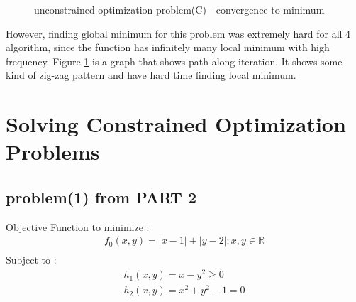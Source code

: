 \documentclass[twoside,11pt]{article}
\begin{document}
\begin{figure}[ht!]%
\centering
{} 
\caption{unconstrained optimization problem(C) - convergence to minimum }
\label{unconstrained problem 3}
\end{figure}

However, finding global minimum for this problem was extremely hard for all 4 algorithm, since the function has infinitely many local minimum with high frequency. Figure \ref{unconstrained problem 3} is a graph that shows path along iteration. It shows some kind of zig-zag pattern and have hard time finding local minimum.
\newpage

\section{Solving Constrained Optimization Problems}
\subsection*{problem(1) from PART 2}
Objective Function to minimize :
\begin{equation}
    \begin{array}{l}
    f_0(x,y)=|x-1|+|y-2|  ; x,y \in \mathbb{R} \\
    \end{array}
\end{equation}
Subject to :
\begin{equation}
    \begin{array}{l}
    h_1(x,y)=x-y^2 \ge 0 \\
    h_2(x,y)=x^2 +y^2 -1=0
    \end{array}
\end{equation}
\end{document}
